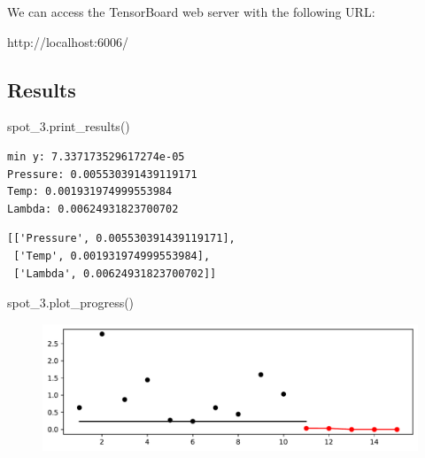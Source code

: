 \documentclass[
  letterpaper,
  DIV=11,
  numbers=noendperiod]{scrreprt}
\newenvironment{Shaded}{\begin{snugshade}}{\end{snugshade}}
\newcommand{\NormalTok}[1]{\textcolor[rgb]{0.00,0.23,0.31}{#1}}
\begin{document}
We can access the TensorBoard web server with the following URL:

\begin{Shaded}
\begin{Highlighting}[]
\NormalTok{http://localhost:6006/}
\end{Highlighting}
\end{Shaded}

\hypertarget{results}{%
\subsection{Results}\label{results}}

\begin{Shaded}
\begin{Highlighting}[]
\NormalTok{spot\_3.print\_results()}
\end{Highlighting}
\end{Shaded}

\begin{verbatim}
min y: 7.337173529617274e-05
Pressure: 0.005530391439119171
Temp: 0.001931974999553984
Lambda: 0.00624931823700702
\end{verbatim}

\begin{verbatim}
[['Pressure', 0.005530391439119171],
 ['Temp', 0.001931974999553984],
 ['Lambda', 0.00624931823700702]]
\end{verbatim}

\begin{Shaded}
\begin{Highlighting}[]
\NormalTok{spot\_3.plot\_progress()}
\end{Highlighting}
\end{Shaded}

\begin{figure}[H]

{\centering \includegraphics{008_num_spot_multidim_files/figure-pdf/cell-7-output-1.pdf}

}

\end{figure}
\end{document}
